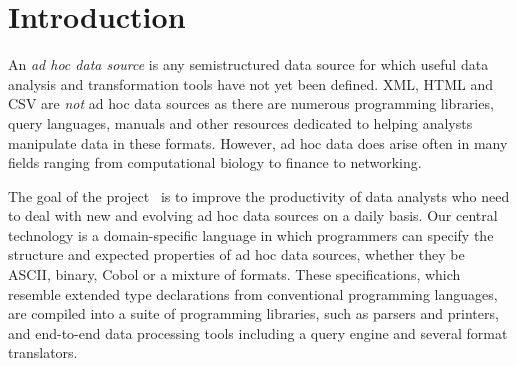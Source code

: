 \documentclass{sig-alternate-sigmod08}
\begin{document}
\begin{abstract}
%
%
\end{abstract}

\section{Introduction}
An {\em ad hoc data source} is any semistructured data source
for which useful data analysis and transformation tools
have not yet been defined. XML, HTML and CSV are {\em not} 
ad hoc data sources as there are numerous programming libraries,
query languages, manuals and other resources dedicated to
helping analysts manipulate data in these formats.
However, ad hoc data does arise often in many fields ranging from
computational biology to finance to networking.

The goal of the \pads{} project~\cite{padsweb} is to improve the
productivity of data analysts who need to deal with new and evolving
ad hoc data sources on a daily basis.  Our central technology is a
domain-specific language in which programmers can specify the
structure and expected properties of ad hoc data sources, whether they
be ASCII, binary, Cobol or a mixture of formats.  These
specifications, which resemble extended type declarations from
conventional programming languages, are compiled into a suite of
programming libraries, such as parsers and printers, and 
end-to-end data processing tools including a query engine
and several format translators.
\end{document}
